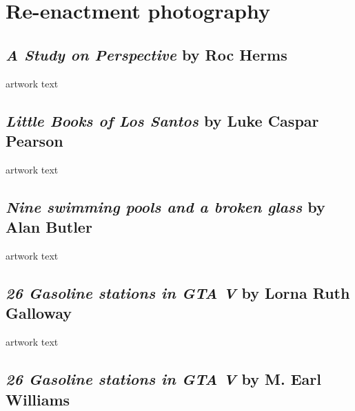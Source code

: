\documentclass[
  openany]{book}
\begin{document}
\hypertarget{re-enactment-photography}{%
\chapter{Re-enactment photography}\label{re-enactment-photography}}

\hypertarget{a-study-on-perspective-by-roc-herms}{%
\section{\texorpdfstring{\emph{A Study on Perspective} by Roc Herms}{A Study on Perspective by Roc Herms}}\label{a-study-on-perspective-by-roc-herms}}

artwork text

\hypertarget{little-books-of-los-santos-by-luke-caspar-pearson}{%
\section{\texorpdfstring{\emph{Little Books of Los Santos} by Luke Caspar Pearson}{Little Books of Los Santos by Luke Caspar Pearson}}\label{little-books-of-los-santos-by-luke-caspar-pearson}}

artwork text

\hypertarget{nine-swimming-pools-and-a-broken-glass-by-alan-butler}{%
\section{\texorpdfstring{\emph{Nine swimming pools and a broken glass} by Alan Butler}{Nine swimming pools and a broken glass by Alan Butler}}\label{nine-swimming-pools-and-a-broken-glass-by-alan-butler}}

artwork text

\hypertarget{gasoline-stations-in-gta-v-by-lorna-ruth-galloway}{%
\section{\texorpdfstring{\emph{26 Gasoline stations in GTA V} by Lorna Ruth Galloway}{26 Gasoline stations in GTA V by Lorna Ruth Galloway}}\label{gasoline-stations-in-gta-v-by-lorna-ruth-galloway}}

artwork text

\hypertarget{gasoline-stations-in-gta-v-by-m.-earl-williams}{%
\section{\texorpdfstring{\emph{26 Gasoline stations in GTA V} by M. Earl Williams}{26 Gasoline stations in GTA V by M. Earl Williams}}\label{gasoline-stations-in-gta-v-by-m.-earl-williams}}
\end{document}

